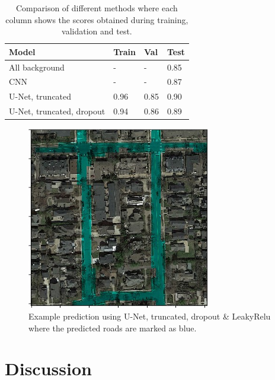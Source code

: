 \documentclass[10pt,conference,compsocconf]{IEEEtran}
\begin{document}
\begin{table}[]
\centering
\begin{tabular}{|l|l|l|l|}
\hline
\textbf{Model}                             & \textbf{Train} & \textbf{Val} & \textbf{Test} \\ \hline
All background & -                    & -                         & 0.85                \\ \hline
CNN \cite{Pavllo2017} & -                    & -                         & 0.87                \\ \hline
U-Net, truncated                           & 0.96                 & 0.85                      & 0.90                \\ \hline
U-Net, truncated, dropout     & 0.94                 & 0.86                      & 0.89                \\ \hline
\end{tabular}
\caption{Comparison of different methods where each column shows the scores obtained during training, validation and test.}
\label{results-list}
\end{table}

\begin{figure}
\includegraphics[width={8cm}]{result}
\caption{Example prediction using U-Net, truncated, dropout \& LeakyRelu where the predicted roads are marked as blue.}
\label{fig:result}
\end{figure}

\section{Discussion}
\end{document}
